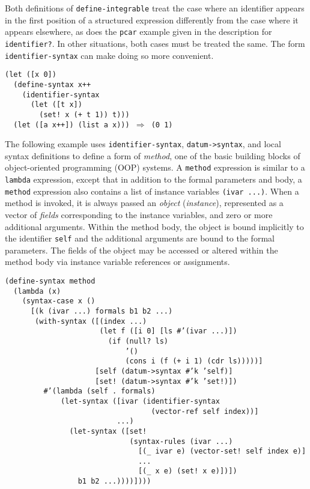 Both definitions of \texttt{define-integrable} treat
the case where an identifier appears
in the first position of a structured expression differently from
the case where it appears elsewhere, as does the \texttt{pcar} example given
in the description for \texttt{identifier?}.
In other situations, both cases must be treated the same.
The form \label{syntax_s62}\texttt{identifier-syntax}
can make doing so more
convenient\label{syntax_s63}.


\begin{alltt}
(let ([x 0])
  (define-syntax x++
    (identifier-syntax
      (let ([t x])
        (set! x (+ t 1)) t)))
  (let ([a x++]) (list a x))) \(\Rightarrow\) (0 1)
\end{alltt}


The following example uses
\label{syntax_s64}\texttt{identifier-syntax},
\label{syntax_s65}\texttt{datum-\textgreater{}syntax},
and local syntax definitions to define a form of \textit{method}, one
of the basic building blocks of
\label{syntax_s66}object-oriented programming (OOP)
systems.
A \label{syntax_s67}\texttt{method} expression is similar to
a \texttt{lambda} expression, except
that in addition to the formal parameters and body, a \texttt{method}
expression also contains a list of instance variables \texttt{(ivar ...)}.
When a method is invoked, it is always passed an \textit{object}
(\textit{instance}),
represented as a vector of \textit{fields} corresponding to the
instance variables, and zero or more additional arguments.
Within the method body, the object is bound implicitly to the
identifier \texttt{self} and the additional arguments are bound to the
formal parameters.
The fields of the object may be accessed or altered within the
method body via instance variable references or assignments.


\begin{alltt}
(define-syntax method\label{syntax_defn_method}
  (lambda (x)
    (syntax-case x ()
      [(k (ivar ...) formals b1 b2 ...)
       (with-syntax ([(index ...)
                      (let f ([i 0] [ls \#{}'(ivar ...)])
                        (if (null? ls)
                            '()
                            (cons i (f (+ i 1) (cdr ls)))))]
                     [self (datum-\textgreater{}syntax \#{}'k 'self)]
                     [set! (datum-\textgreater{}syntax \#{}'k 'set!)])
         \#{}'(lambda (self . formals)
             (let-syntax ([ivar (identifier-syntax
                                  (vector-ref self index))]
                          ...)
               (let-syntax ([set!
                             (syntax-rules (ivar ...)
                               [(\_{} ivar e) (vector-set! self index e)]
                               ...
                               [(\_{} x e) (set! x e)])])
                 b1 b2 ...))))])))
\end{alltt}


